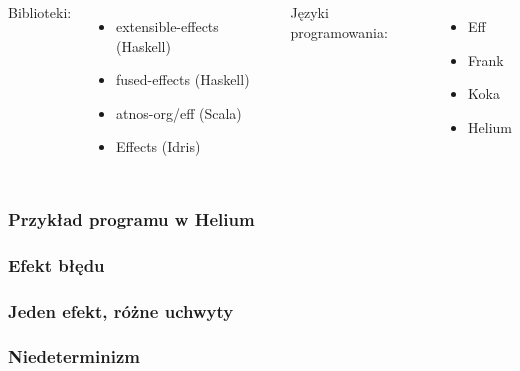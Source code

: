 
\begin{frame}
  \frametitle{}
  \begin{columns}[t]
    \column{.4\paperwidth}
    Biblioteki:
    \begin{itemize}
      \item extensible-effects (Haskell)
      \item fused-effects (Haskell)
      \item atnos-org/eff (Scala)
      \item Effects (Idris)
    \end{itemize}
    \column{.4\paperwidth}
    Języki programowania:
    \begin{itemize}
      \item Eff
      \item Frank
      \item Koka
      \item Helium
    \end{itemize}
  \end{columns}
\end{frame}

\newcommand{\inl}[1]{\lstinline[style=Haleff-inl]{#1}}
\lstset{language=Haleff, showstringspaces=false, inputpath=../thesis/code_examples}

\begin{frame}
  \frametitle{Przykład programu w Helium}
  
\end{frame}

\begin{frame}
  \frametitle{Efekt błędu}
  
  
\end{frame}

\begin{frame}
  \frametitle{Jeden efekt, różne uchwyty}
  
  
\end{frame}

\begin{frame}
  \frametitle{Niedeterminizm}
  
  \begin{columns}[t]
    \column{.455\paperwidth}
    
    \column{.455\paperwidth}
    
  \end{columns}
  
\end{frame}

